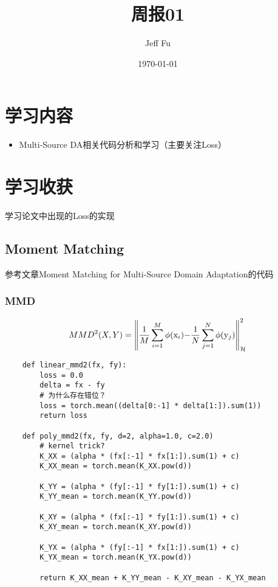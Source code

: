 \documentclass[UTF8]{ctexart}
\title{周报01}
\author{Jeff Fu}
\date{\today}
\begin{document}
    \maketitle
    \section{学习内容}
        \begin{itemize}
            \item Multi-Source DA相关代码分析和学习（主要关注Loss）
        \end{itemize}
    \section{学习收获}
        学习论文中出现的Loss的实现
        \subsection{Moment Matching}
            参考文章Moment Matching for Multi-Source Domain Adaptation的代码
            \subsubsection{MMD}
                $$
                    MMD^2(X, Y) = \left\| {\frac{1}{M}\sum\limits_{i = 1}^M {\phi ({\rm{x}}_i) - } \frac{1}{N}\sum\limits_{j = 1}^N {\phi ({\rm{y}}_j)} } \right\|_\mathcal{H}^2
                $$
                \begin{verbatim}
    def linear_mmd2(fx, fy):
        loss = 0.0
        delta = fx - fy
        # 为什么存在错位？
        loss = torch.mean((delta[0:-1] * delta[1:]).sum(1))
        return loss

    def poly_mmd2(fx, fy, d=2, alpha=1.0, c=2.0)
        # kernel trick?
        K_XX = (alpha * (fx[:-1] * fx[1:]).sum(1) + c)
        K_XX_mean = torch.mean(K_XX.pow(d))
    
        K_YY = (alpha * (fy[:-1] * fy[1:]).sum(1) + c)
        K_YY_mean = torch.mean(K_YY.pow(d))
    
        K_XY = (alpha * (fx[:-1] * fy[1:]).sum(1) + c)
        K_XY_mean = torch.mean(K_XY.pow(d))
    
        K_YX = (alpha * (fy[:-1] * fx[1:]).sum(1) + c)
        K_YX_mean = torch.mean(K_YX.pow(d))
    
        return K_XX_mean + K_YY_mean - K_XY_mean - K_YX_mean
                \end{verbatim}
\end{document}
